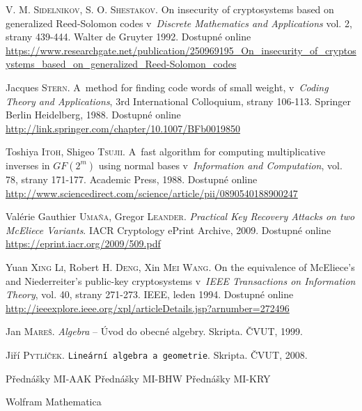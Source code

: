 \documentclass[thesis=M,czech,hidelinks]{FITthesis}[2012/06/26]
\newcommand{\0}{{\textcolor[gray]{0.75}{0}}}
\begin{document}
\begin{thebibliography}{99}
        V. M. \textsc{Sidelnikov}, S. O. \textsc{Shestakov}. On insecurity of
        cryptosystems based on generalized Reed-Solomon codes v~\emph{Discrete
        Mathematics and Applications} vol. 2, strany 439-444. Walter de Gruyter
        1992. Dostupné online
        \url{https://www.researchgate.net/publication/250969195\_On\_insecurity\_of\_cryptosystems\_based\_on\_generalized\_Reed-Solomon\_codes}

        Jacques \textsc{Stern}. A~method for finding code words of small weight,
        v~\emph{Coding Theory and Applications}, 3rd International Colloquium,
        strany 106-113. Springer Berlin Heidelberg, 1988. Dostupné online
        \url{http://link.springer.com/chapter/10.1007/BFb0019850}

        Toshiya \textsc{Itoh}, Shigeo \textsc{Tsujii}. A~fast algorithm for
        computing multiplicative inverses in $GF(2^m)$ using normal bases
        v~\emph{Information and Computation}, vol. 78, strany 171-177. Academic
        Press, 1988.  Dostupné online
        \url{http://www.sciencedirect.com/science/article/pii/0890540188900247}

        Valérie Gauthier \textsc{Umaña}, Gregor \textsc{Leander}.
        \emph{Practical Key Recovery Attacks on two McEliece Variants}.
        IACR Cryptology ePrint Archive, 2009.  Dostupné online
        \url{https://eprint.iacr.org/2009/509.pdf}

        Yuan \textsc{Xing Li}, Robert H. \textsc{Deng}, Xin \textsc{Mei Wang}.
        On the equivalence of McEliece's and Niederreiter's public-key
        cryptosystems v~\emph{IEEE Transactions on Information Theory}, vol. 40,
        strany 271-273. IEEE, leden 1994. Dostupné online
        \url{http://ieeexplore.ieee.org/xpl/articleDetails.jsp?arnumber=272496}

        Jan \textsc{Mareš}. \emph{Algebra} -- Úvod do obecné algebry. Skripta.
        ČVUT, 1999.

        Jiří \textsc{Pytlíček}. \texttt{Lineární algebra a geometrie}. Skripta.
        ČVUT, 2008.

     Přednášky MI-AAK
     Přednášky MI-BHW
     Přednášky MI-KRY

     Wolfram Mathematica
\end{thebibliography}
\end{document}
